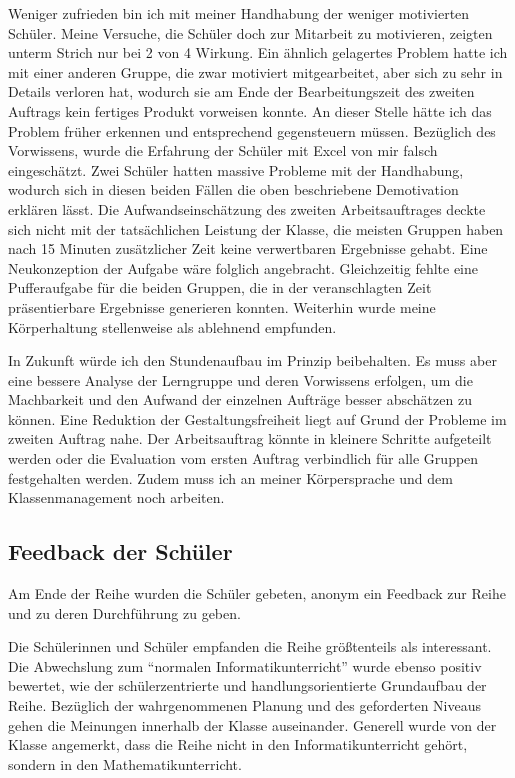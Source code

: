 Weniger zufrieden bin ich mit meiner Handhabung der weniger motivierten Schüler. Meine Versuche, die Schüler doch zur Mitarbeit zu motivieren, zeigten unterm Strich nur bei 2 von 4 Wirkung. Ein ähnlich gelagertes Problem hatte ich mit einer anderen Gruppe, die zwar motiviert mitgearbeitet, aber sich zu sehr in Details verloren hat, wodurch sie am Ende der Bearbeitungszeit des zweiten Auftrags kein fertiges Produkt vorweisen konnte. An dieser Stelle hätte ich das Problem früher erkennen und entsprechend gegensteuern müssen. Bezüglich des Vorwissens, wurde die Erfahrung der Schüler mit Excel von mir falsch eingeschätzt. Zwei Schüler hatten massive Probleme mit der Handhabung, wodurch sich in diesen beiden Fällen die oben beschriebene Demotivation erklären lässt. Die Aufwandseinschätzung des zweiten Arbeitsauftrages deckte sich nicht mit der tatsächlichen Leistung der Klasse, die meisten Gruppen haben nach 15 Minuten zusätzlicher Zeit keine verwertbaren Ergebnisse gehabt. Eine Neukonzeption der Aufgabe wäre folglich angebracht. Gleichzeitig fehlte eine Pufferaufgabe für die beiden Gruppen, die in der veranschlagten Zeit präsentierbare Ergebnisse generieren konnten. Weiterhin wurde meine Körperhaltung stellenweise als ablehnend empfunden. 

In Zukunft würde ich den Stundenaufbau im Prinzip beibehalten. Es muss aber eine bessere Analyse der Lerngruppe und deren Vorwissens erfolgen, um die Machbarkeit und den Aufwand der einzelnen Aufträge besser abschätzen zu können. Eine Reduktion der Gestaltungsfreiheit liegt auf Grund der Probleme im zweiten Auftrag nahe. Der Arbeitsauftrag könnte in kleinere Schritte aufgeteilt werden oder die Evaluation vom ersten Auftrag verbindlich für alle Gruppen festgehalten werden. Zudem muss ich an meiner Körpersprache und dem Klassenmanagement noch arbeiten. 
\subsection{Feedback der Schüler}\steffen
Am Ende der Reihe wurden die Schüler gebeten, anonym ein Feedback zur Reihe und zu deren Durchführung zu geben.

Die Schülerinnen und Schüler empfanden die Reihe größtenteils als interessant. Die Abwechslung zum ``normalen Informatikunterricht'' wurde ebenso positiv bewertet, wie der schülerzentrierte und handlungsorientierte Grundaufbau der Reihe. Bezüglich der wahrgenommenen Planung und des geforderten Niveaus gehen die Meinungen innerhalb der Klasse auseinander. Generell wurde von der Klasse angemerkt, dass die Reihe nicht in den Informatikunterricht gehört, sondern in den Mathematikunterricht.